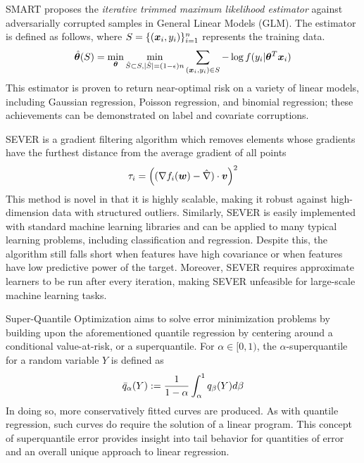 \documentclass{article} %
\begin{document}
	SMART \cite{https://doi.org/10.48550/arxiv.2206.04777} proposes the \textit{iterative trimmed maximum likelihood estimator} against adversarially corrupted samples in General Linear Models (GLM). The estimator is defined as follows, where $S = \{({\bm{x}}_i,y_i)\}_{i=1}^n$ represents the training data. \vspace{1em}
	\begin{equation}
		\hat{{\bm{\theta}}}(S) = \min_{{\bm{\theta}}} \min_{\hat{S} \subset S, |\hat{S}| = (1-{\epsilon})n} \sum_{({\bm{x}}_i,y_i) \in S} -\log f(y_i|{\bm{\theta}}^T{\bm{x}}_i)
	\end{equation}
	This estimator is proven to return near-optimal risk on a variety of linear models, including Gaussian regression, Poisson regression, and binomial regression; these achievements can be demonstrated on label and covariate corruptions.
	
	
	SEVER \cite{DiakonikolasKKLSS19} is a gradient filtering algorithm which removes elements whose gradients have the furthest distance from the average gradient of all points
	\begin{equation}
		\tau_i = \left((\nabla f_i({\bm{w}}) - \hat{\nabla})\cdot {\bm{v}}\right)^2
	\end{equation}
	This method is novel in that it is highly scalable, making it robust against high-dimension data with structured outliers. Similarly, SEVER is easily implemented with standard machine learning libraries and can be applied to many typical learning problems, including classification and regression. Despite this, the algorithm still falls short when features have high covariance or when features have low predictive power of the target. Moreover, SEVER requires approximate learners to be run after every iteration, making SEVER unfeasible for large-scale machine learning tasks. 
	
	Super-Quantile Optimization \cite{ROCKAFELLAR2014140} aims to solve error minimization problems by building upon the aforementioned quantile regression by centering around a conditional value-at-risk, or a superquantile. For $\alpha \in [0,1)$, the $\alpha$-superquantile for a random variable $Y$ is defined as \begin{equation}
		\Bar{q}_\alpha (Y) := \frac{1}{1-\alpha} \int_\alpha^1 q_\beta (Y) d\beta
	\end{equation}
	In doing so, more conservatively fitted curves are produced. As with quantile regression, such curves do require the solution of a linear program.
	This concept of superquantile error provides insight into tail behavior for quantities of error and an overall unique approach to linear regression.
		
\end{document}

